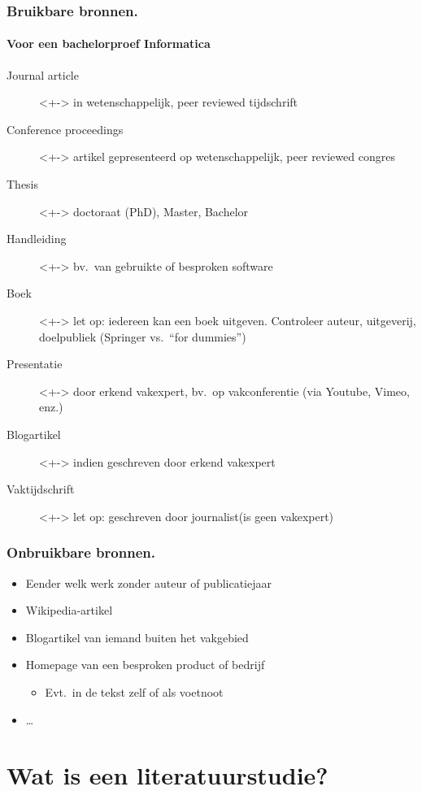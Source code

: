 \documentclass[aspectratio=169]{beamer}
\begin{document}
\begin{frame}
  \frametitle{Bruikbare bronnen.}
  \framesubtitle{Voor een bachelorproef Informatica}

  \begin{description}
    \item[Journal article]<+-> in wetenschappelijk, peer reviewed tijdschrift
    \item[Conference proceedings]<+-> artikel gepresenteerd op wetenschappelijk, peer reviewed congres
    \item[Thesis]<+-> doctoraat (PhD), Master, Bachelor
    \item[Handleiding]<+-> bv.\ van gebruikte of besproken software
    \item[Boek]<+-> let op: iedereen kan een boek uitgeven. Controleer auteur, uitgeverij, doelpubliek (Springer vs.\ ``for dummies'')
    \item[Presentatie]<+-> door erkend vakexpert, bv.\ op vakconferentie (via Youtube, Vimeo, enz.)
    \item[Blogartikel]<+-> indien geschreven door erkend vakexpert
    \item[Vaktijdschrift]<+-> let op: geschreven door journalist\linebreak(is geen vakexpert)
  \end{description}
\end{frame}

\begin{frame}
  \frametitle{Onbruikbare bronnen.}

  \begin{itemize}
    \item Eender welk werk zonder auteur of publicatiejaar
    \item Wikipedia-artikel
    \item Blogartikel van iemand buiten het vakgebied
    \item Homepage van een besproken product of bedrijf
          \begin{itemize}
            \item Evt.~in de tekst zelf of als voetnoot
          \end{itemize}
    \item \dots
  \end{itemize}
\end{frame}

\section{Wat is een literatuurstudie?}
\end{document}
